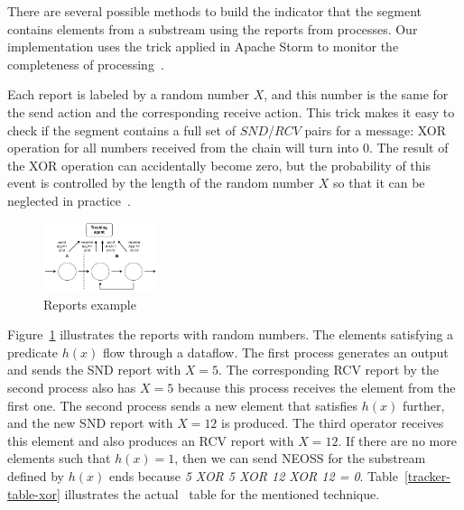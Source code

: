 
There are several possible methods to build the indicator that the segment contains elements from a substream using the reports from processes. Our implementation uses the trick applied in Apache Storm to monitor the completeness of processing~\cite{apache:storm:acker}. 

Each report is labeled by a random number $X$, and this number is the same for the send action and the corresponding receive action. This trick makes it easy to check if the segment contains a full set of $SND$/$RCV$ pairs for a message: XOR operation for all numbers received from the chain will turn into 0. The result of the XOR operation can accidentally become zero, but the probability of this event is controlled by the length of the random number $X$ so that it can be neglected in practice~\cite{apache:storm:acker}.

\begin{figure}[htbp]
  \centering
  \includegraphics[width=0.3\textwidth]{pics/tracker-segments-example.pdf}
  \caption{Reports example}
  \label{fig:tracker-reports}
\end{figure}

Figure~\ref{fig:tracker-reports} illustrates the reports with random numbers. The elements satisfying a predicate $h(x)$ flow through a dataflow. The first process generates an output and sends the SND report with $X=5$. The corresponding RCV report by the second process also has $X=5$ because this process receives the element from the first one. The second process sends a new element that satisfies $h(x)$ further, and the new SND report with $X=12$ is produced. The third operator receives this element and also produces an RCV report with $X=12$. If there are no more elements such that $h(x)=1$, then we can send NEOSS for the substream defined by $h(x)$ ends because {\em 5 XOR 5 XOR 12 XOR 12 = 0}. Table~\ref{tracker-table-xor} illustrates the actual \tracker\ table for the mentioned technique.

